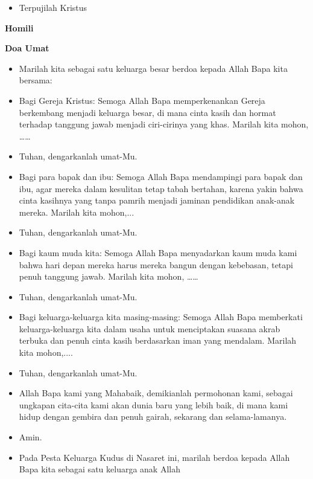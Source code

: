 \documentclass[a5paper,12pt,openany]{scrbook}
\makeatletter
\newcommand{\subjudul}[1]{%
  {\parindent \z@ \normalfont
    \interlinepenalty\@M \bfseries #1\par\nobreak \vskip 20\p@ }}
\newcommand{\BU}[1]{\begin{itemize} \item[U:] #1 \end{itemize}}
\newcommand{\BI}[1]{\begin{itemize} \item[P:] #1 \end{itemize}}
\newcommand{\BP}[1]{\begin{itemize} \item[P:] #1 \end{itemize}}
\makeatother
\begin{document}
\BU{Terpujilah Kristus}

\subjudul{Homili}


\subjudul{Doa Umat}

\BI{Marilah kita sebagai satu keluarga besar berdoa kepada Allah Bapa kita bersama:}

\BP{Bagi Gereja Kristus: Semoga Allah Bapa memperkenankan Gereja berkembang menjadi keluarga besar, di mana cinta kasih dan hormat terhadap tanggung jawab menjadi ciri-cirinya yang khas. Marilah kita mohon, \dots\dots}

\BU{Tuhan, dengarkanlah umat-Mu.} 

\BP{Bagi para bapak dan ibu: Semoga Allah Bapa mendampingi para bapak dan ibu, agar mereka dalam kesulitan tetap tabah bertahan, karena yakin bahwa cinta kasihnya yang tanpa pamrih menjadi jaminan pendidikan anak-anak mereka. Marilah kita mohon,...}

\BU{Tuhan, dengarkanlah umat-Mu.}

\BP{Bagi kaum muda kita: Semoga Allah Bapa menyadarkan kaum muda kami bahwa hari depan mereka harus mereka bangun dengan kebebasan, tetapi penuh tanggung jawab. Marilah kita mohon, \dots\dots}

\BU{Tuhan, dengarkanlah umat-Mu.}

\BP{Bagi keluarga-keluarga kita masing-masing: Semoga Allah Bapa memberkati keluarga-keluarga kita dalam usaha untuk menciptakan suasana akrab terbuka dan penuh cinta kasih berdasarkan iman yang mendalam. Marilah kita mohon,....}

\BU{Tuhan, dengarkanlah umat-Mu.}

\BI{Allah Bapa kami yang Mahabaik, demikianlah permohonan kami, sebagai ungkapan cita-cita kami akan dunia baru yang lebih baik, di mana kami hidup dengan gembira dan penuh gairah, sekarang dan selama-lamanya.}

\BU{Amin.} 


\BI{Pada Pesta Keluarga Kudus di Nasaret ini, marilah berdoa kepada Allah Bapa kita sebagai satu keluarga anak Allah}
\end{document}
